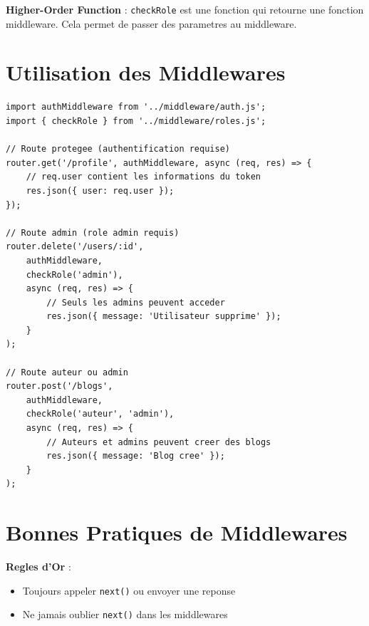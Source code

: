 \documentclass[a4paper,12pt]{book}
\begin{document}
\begin{definitionbox}
    \textbf{Higher-Order Function} : \texttt{checkRole} est une fonction qui retourne une fonction middleware. Cela permet de passer des parametres au middleware.
\end{definitionbox}

\section{Utilisation des Middlewares}

\begin{lstlisting}[style=javascript, caption=Utilisation des middlewares dans les routes]
import authMiddleware from '../middleware/auth.js';
import { checkRole } from '../middleware/roles.js';

// Route protegee (authentification requise)
router.get('/profile', authMiddleware, async (req, res) => {
    // req.user contient les informations du token
    res.json({ user: req.user });
});

// Route admin (role admin requis)
router.delete('/users/:id',
    authMiddleware,
    checkRole('admin'),
    async (req, res) => {
        // Seuls les admins peuvent acceder
        res.json({ message: 'Utilisateur supprime' });
    }
);

// Route auteur ou admin
router.post('/blogs',
    authMiddleware,
    checkRole('auteur', 'admin'),
    async (req, res) => {
        // Auteurs et admins peuvent creer des blogs
        res.json({ message: 'Blog cree' });
    }
);
\end{lstlisting}

\section{Bonnes Pratiques de Middlewares}

\begin{bestpracticebox}
    \textbf{Regles d'Or} :
    \begin{itemize}
        \item Toujours appeler \texttt{next()} ou envoyer une reponse
        \item Ne jamais oublier \texttt{next()} dans les middlewares
    \end{itemize}
\end{bestpracticebox}
\end{document}
